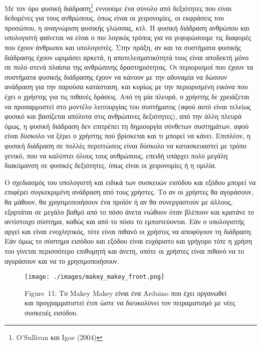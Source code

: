 \documentclass[
]{article}
\begin{document}
Με τον όρο φυσική διάδραση\footnote{O'Sullivan και Igoe (2004)} εννοούμε
ένα σύνολο από δεξιότητες που είναι δεδομένες για τους ανθρώπους, όπως
είναι οι χειρονομίες, οι εκφράσεις του προσώπου, η αναγνώριση φυσικής
γλώσσας, κτλ. Η φυσική διάδραση ανθρώπου και υπολογιστή φαίνεται να
είναι ο πιο λογικός τρόπος για να γεφυρώσουμε τις διαφορές που έχουν
άνθρωποι και υπολογιστές. Στην πράξη, αν και τα συστήματα φυσικής
διάδρασης έχουν ωριμάσει αρκετά, η αποτελεσματικότητά τους είναι
αποδεκτή μόνο σε πολύ στενά πλαίσια της ανθρώπινης δραστηριότητας. Οι
περιορισμοί που έχουν τα συστήματα φυσικής διάδρασης έχουν να κάνουν με
την αδυναμία να δώσουν ανάδραση για την παρούσα κατάσταση, και κυρίως με
την περιορισμένη εικόνα που έχει ο χρήστης για τις πιθανές δράσεις. Από
τη μία πλευρά, ο χρήστης δε χρειάζεται να προσαρμοστεί στο μοντέλο
λειτουργίας του συστήματος (αφού αυτό είναι τελείως φυσικό και βασίζεται
απόλυτα στις ανθρώπινες δεξιότητες), από την άλλη πλευρά όμως, η φυσική
διάδραση δεν επιτρέπει τη δημιουργία σύνθετων συστημάτων, αφού είναι
δύσκολο να ξέρει ο χρήστης πού βρίσκεται και τι μπορεί να κάνει.
Επιπλέον, η φυσική διάδραση σε πολλές περιπτώσεις είναι δύσκολο να
κατασκευαστεί με τρόπο γενικό, που να καλύπτει όλους τους ανθρώπους,
επειδή υπάρχει πολύ μεγάλη διακύμανση σε φυσικές δεξιότητες, όπως είναι
οι χειρονομίες ή η ομιλία.

O σχεδιασμός του υπολογιστή και ειδικά των συσκευών εισόδου και εξόδου
μπορεί να επιφέρει συγκεκριμένη ανάδραση από τους χρήστες. Το αν οι
χρήστες θα αγοράσουν, θα μάθουν, θα χρησιμοποιήσουν ένα προϊόν ή αν θα
συνεργαστούν με άλλους, εξαρτάται σε μεγάλο βαθμό από το πόσο άνετα
νιώθουν όταν βλέπουν και κρατάνε το αντίστοιχο σύστημα, καθώς και από το
πόσο το εμπιστεύονται. Εάν ο υπολογιστής αργεί και είναι ενοχλητικός,
τότε είναι πιθανό οι χρήστες να αποφύγουν τη διάδραση. Εάν όμως το
σύστημα εισόδου και εξόδου είναι ευχάριστο και γρήγορο τότε η χρήση του
γίνεται περισσότερο επιθυμητή και άνετη, οπότε οι χρήστες είναι πιθανό
να το αγοράσουν και να το χρησιμοποιήσουν.

\leavevmode{}%
\begin{figure}
\hypertarget{fig:makey_makey_front}{%
\centering
\texttt{[image: ./images/makey\_makey\_front.png]}
\caption{Figure~11: Το Makey Makey είναι ένα Arduino που έχει οργανωθεί
και προγραμματιστεί έτσι ώστε να διευκολύνει τον πειραματισμό με νέες
συσκευές εισόδου.}\label{fig:makey_makey_front}
}
\end{figure}
\end{document}
